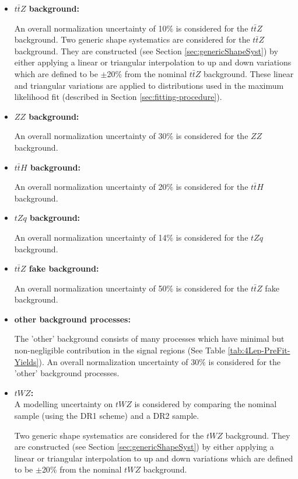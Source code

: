\begin{itemize}
\item \textbf{$t\bar{t}Z$ background:}

An overall normalization uncertainty of 10$\%$ is considered for the $t\bar{t}Z$ background. Two generic shape systematics are considered for the $t\bar{t}Z$ background. They are constructed (see Section \ref{sec:genericShapeSyst}) by either applying a linear or triangular interpolation to up and down variations which are defined to be $\pm$20$\%$ from the nominal $t\bar{t}Z$ background. These linear and triangular variations are applied to distributions used in the maximum likelihood fit (described in Section \ref{sec:fitting-procedure}).

\item \textbf{$ZZ$ background:}

An overall normalization uncertainty of 30$\%$ is considered for the $ZZ$ background.

\item \textbf{$t\bar{t}H$ background:}

An overall normalization uncertainty of 20$\%$ is considered for the $t\bar{t}H$ background.



\item \textbf{$tZq$ background:}

An overall normalization uncertainty of 14$\%$ is considered for the $tZq$ background.


\item \textbf{$t\bar{t}Z$ fake background:}

An overall normalization uncertainty of 50$\%$ is considered for the $t\bar{t}Z$ fake background.


\item \textbf{other background processes:}

The 'other' background consists of many processes which have minimal but non-negligible contribution in the signal regions (See Table \ref{tab:4Lep-PreFit-Yields}). An overall normalization uncertainty of 30$\%$ is considered for the 'other' background processes.


\item \textbf{$tWZ$:}\\
A modelling uncertainty on $tWZ$ is considered by comparing the nominal sample (using the DR1 scheme) and a DR2 sample.

Two generic shape systematics are considered for the $tWZ$ background. They are constructed (see Section \ref{sec:genericShapeSyst}) by either applying a linear or triangular interpolation to up and down variations which are defined to be $\pm$20$\%$ from the nominal $tWZ$ background.

\end{itemize}

